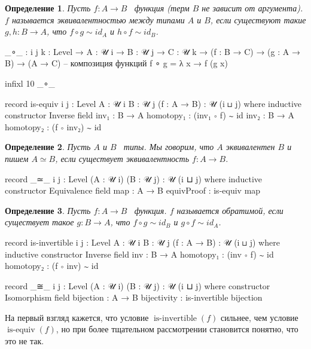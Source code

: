 \documentclass{article}[12pt]
\newtheorem{definition}{Определение}
\newcommand{\dash}{\textemdash\ }
\newcommand{\op}{\operatorname}
\begin{document}
\begin{definition}
    \label{EquivalenceDefinition}
    Пусть $f : A \rightarrow B$ \dash функция (терм $B$ не зависит от аргумента). $f$ называется
    эквивалентностью между типами $A$ и $B$, если существуют такие $g, h : B \rightarrow A$,
    что $f \circ g \sim id_A$ и $h \circ f \sim id_B$.
\end{definition}
\begin{code}
_∘_ : {i j k : Level} → {A : 𝒰 i} → {B : 𝒰 j} → {C : 𝒰 k}
      → (f : B → C) → (g : A → B)
      → (A → C) -- композиция функций
f ∘ g = λ x → f (g x)

infixl 10 _∘_

record is-equiv {i j : Level} {A : 𝒰 i} {B : 𝒰 j} (f : A → B) : 𝒰 (i ⊔ j) where
    inductive
    constructor
        Inverse
    field
        inv₁ : B → A
        homotopy₁ : (inv₁ ∘ f) ∼ id
        inv₂ : B → A
        homotopy₂ : (f ∘ inv₂) ∼ id
\end{code}

\begin{definition}
    \label{TypeEquivalenceDefinition}
    Пусть $A$ и $B$ \dash типы. Мы говорим, что $A$ эквивалентен $B$ и пишем $A \simeq B$,
    если существует эквивалентность $f : A \rightarrow B$.
\end{definition}
\begin{code}
record _≃_ {i j : Level} (A : 𝒰 i) (B : 𝒰 j) : 𝒰 (i ⊔ j) where
    inductive
    constructor
        Equivalence
    field
        map : A → B
        equivProof : is-equiv map
\end{code}

\begin{definition}
    \label{InvertibleDefinition}
    Пусть $f : A \rightarrow B$ \dash функция. $f$ называется обратимой, если существует такое 
    $g : B \rightarrow A$, что $f \circ g \sim id_B$ и $g \circ f \sim id_A$.
\end{definition}
\begin{code}
record is-invertible {i j : Level} {A : 𝒰 i} {B : 𝒰 j} (f : A → B) : 𝒰 (i ⊔ j) where
    inductive
    constructor
        Inverse
    field
        inv : B → A
        homotopy₁ : (inv ∘ f) ∼ id
        homotopy₂ : (f ∘ inv) ∼ id

record _≅_ {i j : Level} (A : 𝒰 i) (B : 𝒰 j) : 𝒰 (i ⊔ j) where
    constructor
        Isomorphism
    field
        bijection   : A → B
        bijectivity : is-invertible bijection
\end{code}

На первый взгляд кажется, что условие $\op{is-invertible}(f)$ сильнее, чем условие $\op{is-equiv}(f)$, но при более
тщательном рассмотрении становится понятно, что это не так.
\end{document}
